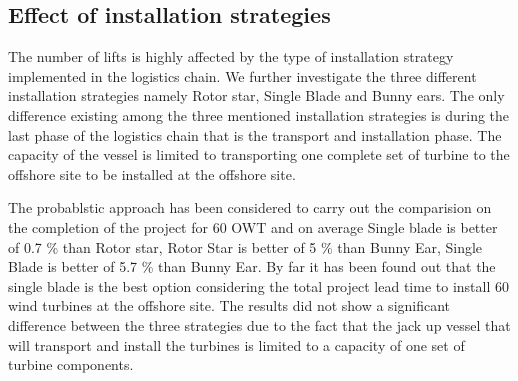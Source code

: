\subsection{Effect of installation strategies}
The number of lifts is highly affected by the type of installation strategy implemented in the logistics chain. We further investigate the three different installation strategies namely Rotor star, Single Blade and Bunny ears. The only difference existing among the three mentioned installation strategies is during the last phase of the logistics chain that is the transport and installation phase. The capacity of the vessel is limited to transporting one complete set of turbine to the offshore site to be installed at the offshore site.

The probablstic approach has been considered to carry out the comparision on the completion of the project for 60 OWT and on average Single blade is better of 0.7 \% than Rotor star, Rotor Star is better of 5 \% than Bunny Ear, Single Blade is better of 5.7 \% than Bunny Ear. By far it has been found out that the single blade is the best option considering the total project lead time to install 60 wind turbines at the offshore site. The results did not show a significant difference between the three strategies due to the fact that the jack up vessel that will transport and install the turbines is limited to a capacity of one set of turbine components. 